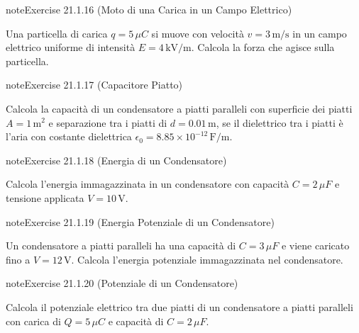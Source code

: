 \documentclass[letterpaper,10pt,italian]{jupyterBook}
\begin{document}
\begin{sphinxadmonition}{note}{Exercise 21.1.16 (Moto di una Carica in un Campo Elettrico)}



\sphinxAtStartPar
Una particella di carica \(q = 5 \, \mu C\) si muove con velocità \(v = 3 \, \text{m/s}\) in un campo elettrico uniforme di intensità \(E = 4 \, \text{kV/m}\). Calcola la forza che agisce sulla particella.
\end{sphinxadmonition}
 \label{exercise:ch/electromagnetism/electrostatics-problems-exercise-16}

\begin{sphinxadmonition}{note}{Exercise 21.1.17 (Capacitore Piatto)}



\sphinxAtStartPar
Calcola la capacità di un condensatore a piatti paralleli con superficie dei piatti \(A = 1 \, \text{m}^2\) e separazione tra i piatti di \(d = 0.01 \, \text{m}\), se il dielettrico tra i piatti è l’aria con costante dielettrica \(\epsilon_0 = 8.85 \times 10^{-12} \, \text{F/m}\).
\end{sphinxadmonition}
 \label{exercise:ch/electromagnetism/electrostatics-problems-exercise-17}

\begin{sphinxadmonition}{note}{Exercise 21.1.18 (Energia di un Condensatore)}



\sphinxAtStartPar
Calcola l’energia immagazzinata in un condensatore con capacità \(C = 2 \, \mu F\) e tensione applicata \(V = 10 \, \text{V}\).
\end{sphinxadmonition}
 \label{exercise:ch/electromagnetism/electrostatics-problems-exercise-18}

\begin{sphinxadmonition}{note}{Exercise 21.1.19 (Energia Potenziale di un Condensatore)}



\sphinxAtStartPar
Un condensatore a piatti paralleli ha una capacità di \(C = 3 \, \mu F\) e viene caricato fino a \(V = 12 \, \text{V}\). Calcola l’energia potenziale immagazzinata nel condensatore.
\end{sphinxadmonition}
 \label{exercise:ch/electromagnetism/electrostatics-problems-exercise-19}

\begin{sphinxadmonition}{note}{Exercise 21.1.20 (Potenziale di un Condensatore)}



\sphinxAtStartPar
Calcola il potenziale elettrico tra due piatti di un condensatore a piatti paralleli con carica di \(Q = 5 \, \mu C\) e capacità di \(C = 2 \, \mu F\).
\end{sphinxadmonition}
 \label{exercise:ch/electromagnetism/electrostatics-problems-exercise-20}
\end{document}

